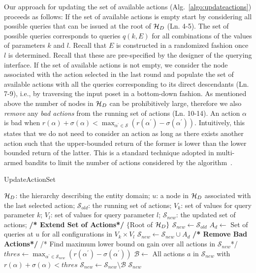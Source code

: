 Our approach for updating the set of available actions (Alg.~\ref{algo:updateactions}) proceeds as follows: If the set of available actions is empty start by considering all possible queries that can be issued at the root of $\mathcal{H}_D$ (Ln. 4-5). The set of possible queries corresponds to queries $q(k,E)$ for all combinations of the values of parameters $k$ and $l$. Recall that $E$ is constructed in a randomized fashion once $l$ is determined. Recall that these are pre-specified by the designer of the querying interface. If the set of available actions is not empty, we consider the node associated with the action selected in the last round and populate the set of available actions with all the queries corresponding to its direct descendants (Ln. 7-9), i.e., by traversing the input poset in a bottom-down fashion. As mentioned above the number of nodes in $\mathcal{H}_D$ can be prohibitively large, therefore we also {\em remove} any {\em bad actions} from the running set of actions (Ln.  10-14). 
An action $\alpha$ is bad when $r(\alpha) + \sigma(\alpha) < \max_{\alpha^{\prime} \in \mathcal{S}} (r(\alpha^{\prime}) - \sigma(\alpha^{\prime}))$. Intuitively, this states that we do not need to consider an action as long as there exists another action such that the upper-bounded return of the former is lower than the lower bounded return of the latter. This is a standard technique adopted in multi-armed bandits to limit the number of actions considered by the algorithm~\cite{EvenDar06actionelimination}. 


\begin{algorithm}[h]
\small\caption{UpdateActionSet}
\label{algo:updateactions}
\begin{algorithmic}[1]
 $\mathcal{H}_D$: the hierarchy describing the entity domain; $u$: a node in $\mathcal{H}_D$ associated with the last selected action; $\mathcal{S}_{old}$: the running set of actions; $V_k$: set of values for query parameter $k$; $V_l$: set of values for query parameter $l$;
 $\mathcal{S}_{new}$: the updated set of actions;
\STATE \textbf{/* Extend Set of Actions*/}
	\RETURN $\{$Root of $\mathcal{H}_D \}$
\ENDIF 
\STATE $\mathcal{S}_{new} \leftarrow \mathcal{S}_{old}$
\STATE $A_d \leftarrow$ Set of queries at $u$ for all configurations in $V_k \times V_l$
\STATE $\mathcal{S}_{new} \leftarrow \mathcal{S}_{new} \cup A_d$
\ENDFOR
\STATE \textbf{/* Remove Bad Actions*/}
\STATE /* Find maximum lower bound on gain over all actions in $\mathcal{S}_{new}$*/
\STATE $thres \leftarrow \max_{\alpha^{\prime} \in \mathcal{S}_{new}} (r(\alpha^{\prime}) - \sigma(\alpha^{\prime}))$  
\STATE $\mathcal{B} \leftarrow$ All actions $a$ in $\mathcal{S}_{new}$ with $r(\alpha) + \sigma(\alpha) < thres$
\STATE $\mathcal{S}_{new} \leftarrow \mathcal{S}_{new} \setminus \mathcal{B}$
\RETURN $\mathcal{S}_{new}$
\end{algorithmic}
\end{algorithm}
\vspace{-5pt}
